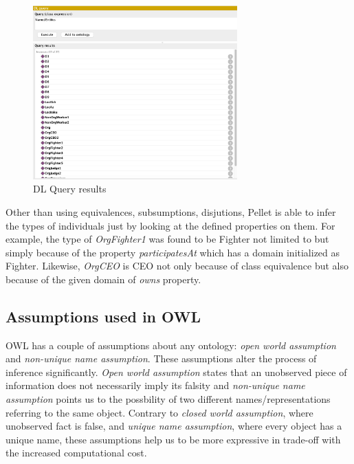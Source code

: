 \documentclass[a4paper]{article}
\begin{document}
\begin{figure}[H]
	\centering
	\includegraphics[width=0.7\textwidth]{resources/dl_query.png}
	\caption{DL Query results}
	\label{fig:dl_query}
\end{figure}

Other than using equivalences, subsumptions, disjutions, Pellet is able to infer the types of individuals just by looking at the defined properties on them. For example, the type of \textit{OrgFighter1} 
was found to be Fighter not limited to but simply because of the property \textit{participatesAt} which has a domain initialized as Fighter. Likewise, \textit{OrgCEO} is CEO not only because of class 
equivalence but also because of the given domain of \textit{owns} property.

\subsection{Assumptions used in OWL}
OWL has a couple of assumptions about any ontology: \textit{open world assumption} and \textit{non-unique name assumption}. These assumptions alter the process of inference significantly.
\textit{Open world assumption} states that an unobserved piece of information does not necessarily imply its falsity and \textit{non-unique name assumption} points us to the possbility of two 
different names/representations referring to the same object. Contrary to \textit{closed world assumption}, where unobserved fact is false, and \textit{unique name assumption}, where 
every object has a unique name, these assumptions help us to be more expressive in trade-off with the increased computational cost. 
\end{document}
